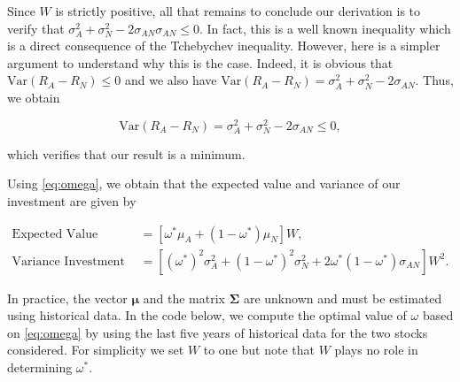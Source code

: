 \documentclass[12pt,]{krantz}
\begin{document}
Since \(W\) is strictly positive, all that remains to conclude our
derivation is to verify that
\(\sigma_A^2 + \sigma_N^2 - 2\sigma_{AN} \sigma_{AN} \leq 0\). In fact,
this is a well known inequality which is a direct consequence of the
Tchebychev inequality. However, here is a simpler argument to understand
why this is the case. Indeed, it is obvious that
\(\text{Var}(R_A - R_N) \leq 0\) and we also have
\(\text{Var}(R_A - R_N) = \sigma_A^2 + \sigma_N^2 - 2\sigma_{AN}\).
Thus, we obtain

\[\text{Var}(R_A - R_N) = \sigma_A^2 + \sigma_N^2 - 2\sigma_{AN} \leq 0,\]

which verifies that our result is a minimum.

\newline

Using \eqref{eq:omega}, we obtain that the expected value and variance of
our investment are given by

\[
\begin{aligned}
\text{Expected Value Investment} &=\left[\omega^* \mu_A + (1 - \omega^*) \mu_N\right] W,\\
\text{Variance Investment} &=  \left[(\omega^*)^2 \sigma_A^2 + (1 - \omega^*)^2 \sigma_N^2 + 2 \omega^* (1 - \omega^*) \sigma_{AN}\right]W^2.
\end{aligned}
\]

In practice, the vector \(\boldsymbol{\mu}\) and the matrix
\(\boldsymbol{\Sigma}\) are unknown and must be estimated using
historical data. In the code below, we compute the optimal value of
\(\omega\) based on \eqref{eq:omega} by using the last five years of
historical data for the two stocks considered. For simplicity we set
\(W\) to one but note that \(W\) plays no role in determining
\(\omega^*\).
\end{document}
